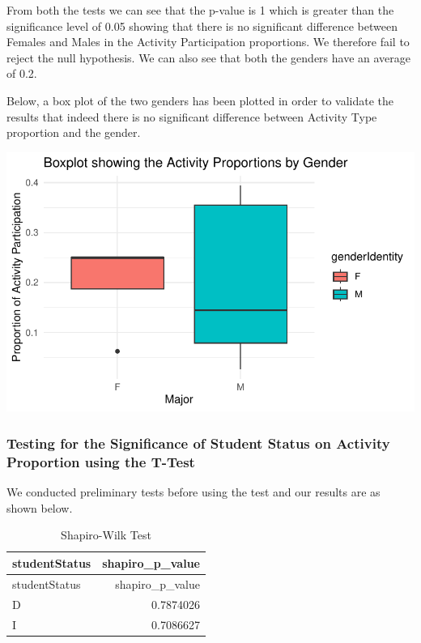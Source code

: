 \documentclass[
  letterpaper,
  DIV=11,
  numbers=noendperiod]{scrartcl}
\begin{document}
From both the tests we can see that the p-value is 1 which is greater
than the significance level of 0.05 showing that there is no significant
difference between Females and Males in the Activity Participation
proportions. We therefore fail to reject the null hypothesis. We can
also see that both the genders have an average of 0.2.

Below, a box plot of the two genders has been plotted in order to
validate the results that indeed there is no significant difference
between Activity Type proportion and the gender.

\includegraphics{technical_report_files/figure-pdf/r10-1.pdf}

\subsubsection{Testing for the Significance of Student Status on
Activity Proportion using the
T-Test}\label{testing-for-the-significance-of-student-status-on-activity-proportion-using-the-t-test}

We conducted preliminary tests before using the test and our results are
as shown below.

\begin{longtable}[]{@{}lr@{}}
\caption{Shapiro-Wilk Test}\tabularnewline
\toprule\noalign{}
studentStatus & shapiro\_p\_value \\
\midrule\noalign{}
\endfirsthead
\toprule\noalign{}
studentStatus & shapiro\_p\_value \\
\midrule\noalign{}
\endhead
\bottomrule\noalign{}
\endlastfoot
D & 0.7874026 \\
I & 0.7086627 \\
\end{longtable}
\end{document}
